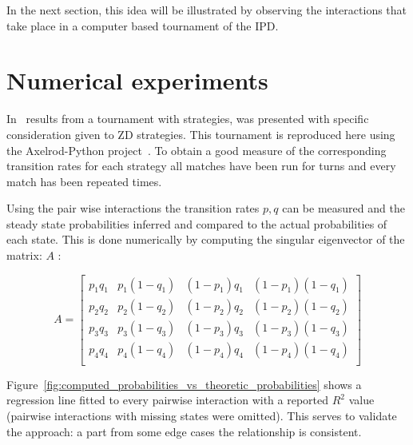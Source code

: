 \documentclass[a4paper]{article}
\begin{document}

In the next section, this idea will be illustrated by observing the interactions
that take place in a computer based tournament of the IPD\@.

\section{Numerical experiments}\label{sec:numerical-experiments}

In~\cite{Stewart2012} results from a tournament with
 strategies,
was presented with specific consideration given to ZD strategies. This
tournament is reproduced here using the Axelrod-Python
project~\cite{Knight2016}. To obtain a good measure of the corresponding
transition rates for each strategy all matches have been run for
 turns and every match has been
repeated  times.

Using the pair wise interactions the transition rates \(p,
q\) can be measured and the steady state probabilities inferred and compared to
the actual probabilities of each state.
This is done numerically by computing the singular eigenvector of the
matrix: \(A\) \cite{Stewart2009}:

\[
    A =
    \begin{bmatrix}
        p_1 q_1 & p_1 (1 - q_1) & (1 - p_1) q_1 & (1 -p_1) (1 - q_1) \\
        p_2 q_2 & p_2 (1 - q_2) & (1 - p_2) q_2 & (1 -p_2) (1 - q_2) \\
        p_3 q_3 & p_3 (1 - q_3) & (1 - p_3) q_3 & (1 -p_3) (1 - q_3) \\
        p_4 q_4 & p_4 (1 - q_4) & (1 - p_4) q_4 & (1 -p_4) (1 - q_4) \\
    \end{bmatrix}
\]

Figure~\ref{fig:computed_probabilities_vs_theoretic_probabilities}
shows a regression line fitted to every pairwise interaction with a reported
\(R^2\) value (pairwise interactions with missing states were omitted). This
serves to validate the approach: a part from some edge cases the relationship is
consistent.
\end{document}
